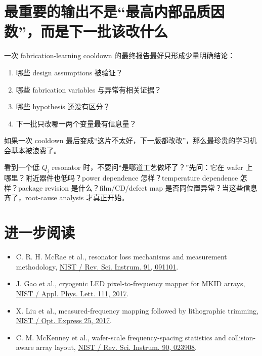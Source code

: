 \section{最重要的输出不是“最高内部品质因数”，而是下一批该改什么}

一次 fabrication-learning cooldown 的最终报告最好只形成少量明确结论：

\begin{enumerate}
  \item 哪些 design assumptions 被验证？
  \item 哪些 fabrication variables 与异常有相关证据？
  \item 哪些 hypothesis 还没有区分？
  \item 下一批只改哪一两个变量最有信息量？
\end{enumerate}

如果一次 cooldown 最后变成“这片不太好，下一版都改改”，那么最珍贵的学习机会基本被浪费了。

\begin{checkpointbox}
看到一个低 $Q_i$ resonator 时，不要问“是哪道工艺做坏了？”先问：它在 wafer 上哪里？附近器件也低吗？power dependence 怎样？temperature dependence 怎样？package revision 是什么？film/CD/defect map 是否同位置异常？当这些信息齐了，root-cause analysis 才真正开始。
\end{checkpointbox}

\section*{进一步阅读}

\begin{itemize}
  \item C. R. H. McRae et al., resonator loss mechanisms and measurement methodology, \href{https://www.nist.gov/publications/materials-loss-measurements-using-superconducting-microwave-resonators}{NIST / Rev. Sci. Instrum. 91, 091101}.
  \item J. Gao et al., cryogenic LED pixel-to-frequency mapper for MKID arrays, \href{https://www.nist.gov/publications/cryogenic-led-pixel-frequency-mapper-kinetic-inductance-detector-arrays}{NIST / Appl. Phys. Lett. 111, 2017}.
  \item X. Liu et al., measured-frequency mapping followed by lithographic trimming, \href{https://www.nist.gov/publications/superconducting-micro-resonator-arrays-ideal-frequency-spacing}{NIST / Opt. Express 25, 2017}.
  \item C. M. McKenney et al., wafer-scale frequency-spacing statistics and collision-aware array layout, \href{https://www.nist.gov/publications/tile-and-trim-micro-resonator-array-fabrication-optimized-high-multiplexing-factors}{NIST / Rev. Sci. Instrum. 90, 023908}.
\end{itemize}
